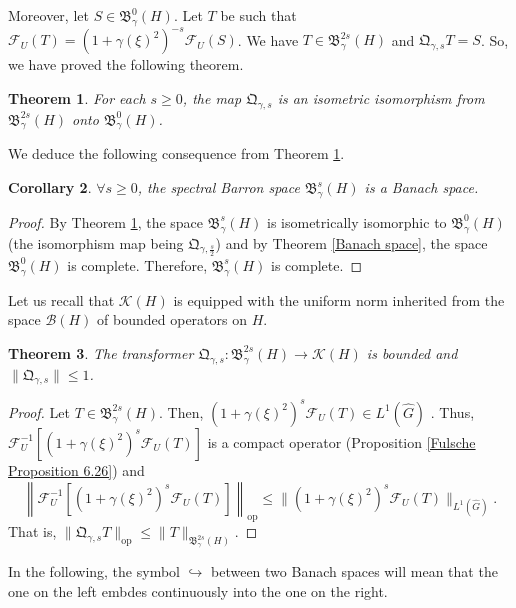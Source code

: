 \documentclass[11pt,a4paper]{amsart}
\newtheorem{theorem}{Theorem}[section]
\newtheorem{corollary}[theorem]{Corollary}
\begin{document}
Moreover, let $S\in \mathfrak{B}^{0}_\gamma (H)$. Let $T$ be such that $\mathcal{F}_U(T)=(1+\gamma(\xi)^2)^{-s}\mathcal{F}_U(S)$. We have $T\in \mathfrak{B}^{2s}_\gamma (H)$ and $\mathfrak{Q}_{\gamma,s}T=S$. So, we have proved the following theorem. 

\begin{theorem}\label{Q isometry}
For each $s\geq 0$, the map $\mathfrak{Q}_{\gamma,s}$ is an isometric isomorphism from $\mathfrak{B}^{2s}_\gamma (H)$ onto $\mathfrak{B}^{0}_\gamma (H)$. 
\end{theorem}
We deduce the following consequence from Theorem \ref{Q isometry}.
\begin{corollary}
$\forall s\geq 0$, the spectral Barron space $\mathfrak{B}^{s}_\gamma (H)$ is a Banach space. 
\end{corollary}
\begin{proof}
 By Theorem \ref{Q isometry}, the space $\mathfrak{B}^{s}_\gamma (H)$ is isometrically isomorphic to $\mathfrak{B}^{0}_\gamma (H)$ (the isomorphism map being $\mathfrak{Q}_{\gamma,\frac{s}{2}}$) and by Theorem \ref{Banach space}, the space $\mathfrak{B}^{0}_\gamma (H)$ is complete. Therefore,  $\mathfrak{B}^{s}_\gamma (H)$ is complete. 
\end{proof}


Let us recall that $\mathcal{K}(H)$ is equipped with the uniform norm inherited from the space $\mathcal{B}(H)$ of bounded operators  on $H$.

\begin{theorem}
The transformer $\mathfrak{Q}_{\gamma,s}: \mathfrak{B}^{2s}_\gamma (H) \rightarrow \mathcal{K}(H)$ is bounded and $\|\mathfrak{Q}_{\gamma,s}\|\leq 1$.
\end{theorem}
\begin{proof}
Let $T\in \mathfrak{B}^{2s}_\gamma (H)$. Then, $(1+\gamma(\xi)^2)^{s}\mathcal{F}_U(T)\in L^1(\widehat{G})$ . Thus,  $\mathcal{F}_U^{-1}\left[(1+\gamma(\xi)^2)^{s}\mathcal{F}_U(T)\right]$ is a compact operator (Proposition \ref{Fulsche Proposition 6.26}) and 
$$\left\|\mathcal{F}_U^{-1}\left[(1+\gamma(\xi)^2)^s\mathcal{F}_U(T)\right]\right\|_{\mbox{op}}\leq \|(1+\gamma(\xi)^2)^s\mathcal{F}_U(T)\|_{L^1(\widehat{G})}.$$ 
That is, $\|\mathfrak{Q}_{\gamma,s}  T\|_{\mbox{op}}\leq \|T\|_{\mathfrak{B}^{2s}_\gamma (H)}$.

\end{proof}

In the following, the symbol $\hookrightarrow$ between two Banach spaces will mean that the one on the left embdes continuously  into the one on the right.
\end{document}
